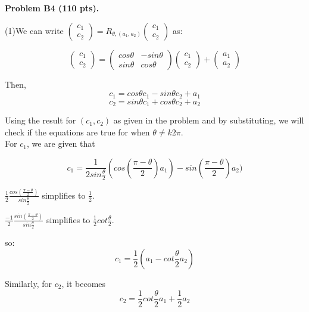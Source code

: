 \documentclass[12pt]{article}
\begin{document}
\vspace {0.5cm}\noindent
{\bf Problem B4 (110 pts).}

\medskip
(1)We can write 
$\begin{pmatrix}
c_1\\
c_2
\end{pmatrix} = R_{\theta,(a_1,a_2)} \begin{pmatrix}
c_1\\
c_2
\end{pmatrix}$ as:

\vspace{0.25cm}
 \[\begin{pmatrix}
c_1\\
c_2
\end{pmatrix}= \begin{pmatrix}
  cos\theta & -sin\theta\\
  sin\theta & cos\theta
  \end{pmatrix}\begin{pmatrix}
c_1\\
c_2
\end{pmatrix} +\begin{pmatrix}
a_1\\
a_2
\end{pmatrix}\]
  
Then,
\begin{equation}
c_1 = cos\theta c_1 - sin\theta c_2 + a_1 \end{equation}
\begin{equation} c_2 = sin\theta c_1 + cos\theta c_2 + a_2 \end{equation}

Using the result for $(c_1,c_2)$ as given in the problem and by substituting, we will check if the equations are true for when $\theta\ne k2\pi$.\\

For $c_1$, we are given that
  
$$c_1=\frac{1}{2sin\frac{\theta}{2}} (cos(\frac{\pi - \theta}{2})a_1)- sin(\frac{\pi- \theta}{2})a_2)$$


 $\frac{1}{2}\frac{cos(\frac{\pi - \theta}{2})}{sin\frac{\theta}{2}}$ simplifies to $\frac{1}{2}$.

 $\frac{-1}{2}\frac{sin(\frac{\pi - \theta}{2})}{sin\frac{\theta}{2}}$ simplifies to $ \frac{1}{2}cot \frac{\theta}{2}$.

so: $$c_1 = \frac{1}{2} (a_1 - cot \frac{\theta}{2}a_2)$$

Similarly, for $c_2$,  it becomes
$$c_2= \frac{1}{2}cot\frac {\theta}{2}a_1 + \frac{1}{2}a_2$$
\end{document}
